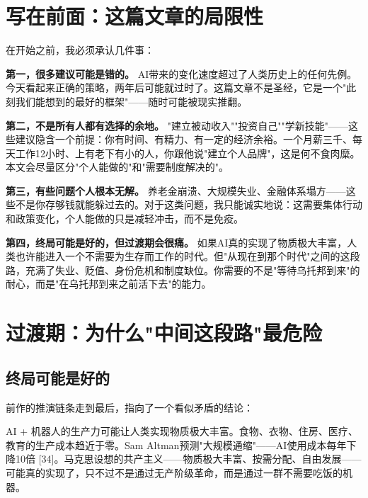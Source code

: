 \documentclass[a4paper,12pt,UTF8]{ctexart}
\begin{document}
\section*{写在前面：这篇文章的局限性}

在开始之前，我必须承认几件事：

\textbf{第一，很多建议可能是错的。} AI带来的变化速度超过了人类历史上的任何先例。今天看起来正确的策略，两年后可能就过时了。这篇文章不是圣经，它是一个"此刻我们能想到的最好的框架"——随时可能被现实推翻。

\textbf{第二，不是所有人都有选择的余地。} "建立被动收入""投资自己""学新技能"——这些建议隐含一个前提：你有时间、有精力、有一定的经济余裕。一个月薪三千、每天工作12小时、上有老下有小的人，你跟他说"建立个人品牌"，这是何不食肉糜。本文会尽量区分"个人能做的"和"需要制度解决的"。

\textbf{第三，有些问题个人根本无解。} 养老金崩溃、大规模失业、金融体系塌方——这些不是你存够钱就能躲过去的。对于这类问题，我只能诚实地说：这需要集体行动和政策变化，个人能做的只是减轻冲击，而不是免疫。

\textbf{第四，终局可能是好的，但过渡期会很痛。} 如果AI真的实现了物质极大丰富，人类也许能进入一个不需要为生存而工作的时代。但"从现在到那个时代"之间的这段路，充满了失业、贬值、身份危机和制度缺位。你需要的不是"等待乌托邦到来"的耐心，而是"在乌托邦到来之前活下去"的能力。

\section{过渡期：为什么"中间这段路"最危险}

\subsection{终局可能是好的}

前作的推演链条走到最后，指向了一个看似矛盾的结论：

AI + 机器人的生产力可能让人类实现物质极大丰富。食物、衣物、住房、医疗、教育的生产成本趋近于零。Sam Altman预测"大规模通缩"——AI使用成本每年下降10倍 [34]。马克思设想的共产主义——物质极大丰富、按需分配、自由发展——可能真的实现了，只不过不是通过无产阶级革命，而是通过一群不需要吃饭的机器。
\end{document}
